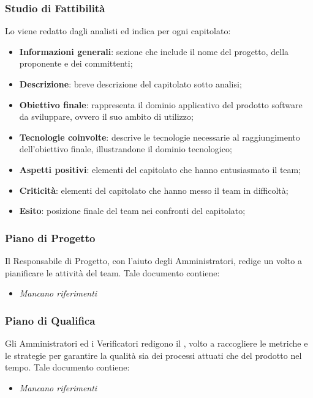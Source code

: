         \subsubsection{Studio di Fattibilità}
        Lo \SdF{} viene redatto dagli analisti ed indica per ogni capitolato:
        \begin{itemize}
            \item{\textbf{Informazioni generali}: sezione che include il nome del progetto, della proponente e dei committenti;}
            \item{\textbf{Descrizione}: breve descrizione del capitolato sotto analisi;}
            \item{\textbf{Obiettivo finale}: rappresenta il dominio applicativo del prodotto software da sviluppare, ovvero il suo ambito di utilizzo;}
            \item{\textbf{Tecnologie coinvolte}: descrive le tecnologie necessarie al raggiungimento dell'obiettivo finale, illustrandone il dominio tecnologico;}
            \item{\textbf{Aspetti positivi}: elementi del capitolato che hanno entusiasmato il team;}
            \item{\textbf{Criticità}: elementi del capitolato che hanno messo il team in difficoltà;}
            \item{\textbf{Esito}: posizione finale del team nei confronti del capitolato;}
        \end{itemize}
        
        \subsubsection{Piano di Progetto}
        Il Responsabile di Progetto, con l'aiuto degli Amministratori, redige un \PdP{} volto a pianificare le attività del team. Tale documento contiene:
        \begin{itemize}
        		\item{\textit{Mancano riferimenti}}
        \end{itemize}
        
        \subsubsection{Piano di Qualifica}
        Gli Amministratori ed i Verificatori redigono il \PdQ, volto a raccogliere le metriche e le strategie per garantire la qualità sia dei processi attuati che del prodotto nel tempo. Tale documento contiene:
        \begin{itemize}
        		\item{\textit{Mancano riferimenti}}
        \end{itemize}
        
